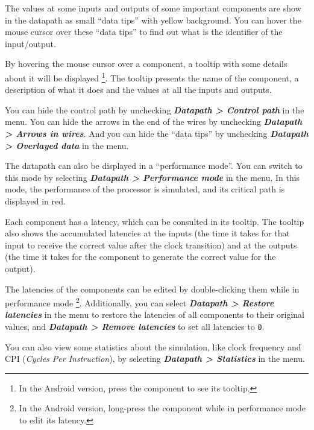 \documentclass[11pt,a4paper,twoside,titlepage]{article}
\newcommand{\menupath}[1]{\textbf{\emph{#1}}}
\begin{document}
The values at some inputs and outputs of some important components are
show in the datapath as small ``data tips'' with yellow background.
You can hover the mouse cursor over these ``data tips'' to find out what
is the identifier of the input/output.

By hovering the mouse cursor over a component, a tooltip with some details
about it will be displayed \footnote{In the Android version, press the 
component to see its tooltip.}.
The tooltip presents the name of the component, a description of what it
does and the values at all the inputs and outputs.

You can hide the control path by unchecking 
\menupath{Datapath > Control path} in the menu.
You can hide the arrows in the end of the wires by unchecking
\menupath{Datapath > Arrows in wires}.
And you can hide the ``data tips'' by unchecking
\menupath{Datapath > Overlayed data} in the menu.

\bigskip

The datapath can also be displayed in a ``performance mode''. You can
switch to this mode by selecting \menupath{Datapath > Performance mode}
in the menu.
In this mode, the performance of the processor is simulated, and its
critical path is displayed in red.

Each component has a latency, which can be consulted in its tooltip.
The tooltip also shows the accumulated latencies at the inputs (the time it
takes for that input to receive the correct value after the clock transition)
and at the outputs (the time it takes for the component to generate the
correct value for the output).

The latencies of the components can be edited by double-clicking them while
in performance mode \footnote{In the Android version, long-press the 
component while in performance mode to edit its latency.}.
Additionally, you can select \menupath{Datapath > Restore latencies} in the
menu to restore the latencies of all components to their original values,
and \menupath{Datapath > Remove latencies} to set all latencies to \verb+0+.

You can also view some statistics about the simulation, like clock frequency
and CPI (\emph{Cycles Per Instruction}), by selecting 
\menupath{Datapath > Statistics} in the menu.
\end{document}
